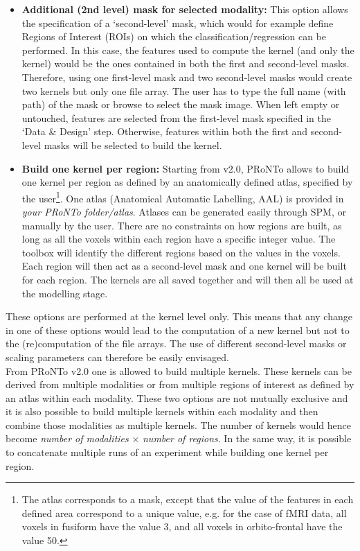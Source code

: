 \begin{itemize}

\item \textbf{Additional (2nd level) mask for selected modality:} This option allows the specification of a `second-level' mask, which would for example define Regions of Interest (ROIs) on which the classification/regression can be performed. In this case, the features used to compute the kernel (and only the kernel) would be the ones contained in both the first and second-level masks. Therefore, using one first-level mask and two second-level masks would create two kernels but only one file array. The user has to type the full name (with path) of the mask or browse to select the mask image. When left empty or untouched, features are selected from the first-level mask specified in the `Data \& Design' step. Otherwise, features within both the first and second-level masks will be selected to build the kernel.

\item \textbf{Build one kernel per region:} Starting from v2.0, PRoNTo allows to build one kernel per region as defined by an anatomically defined atlas, specified by the user\footnote{The atlas corresponds to a mask, except that the value of the features in each defined area correspond to a unique value, e.g. for the case of fMRI data, all voxels in fusiform have the value 3, and all voxels in orbito-frontal have the value 50.}. One atlas (Anatomical Automatic Labelling, AAL) is provided in \textit{your PRoNTo folder/atlas}. Atlases can be generated easily through SPM, or manually by the user. There are no constraints on how regions are built, as long as all the voxels within each region have a specific integer value. The toolbox will identify the different regions based on the values in the voxels. Each region will then act as a second-level mask and one kernel will be built for each region. The kernels are all saved together and will then all be used at the modelling stage.
\end{itemize}

These options are performed at the kernel level only. This means that any change in one of these options would lead to the computation of a new kernel but not to the (re)computation of the file arrays. The use of different second-level masks or scaling parameters can therefore be easily envisaged.
\\

From PRoNTo v2.0 one is allowed to build multiple kernels. These kernels can be derived from multiple modalities or from multiple regions of interest as defined by an atlas within each modality. These two options are not mutually exclusive and it is also possible to build multiple kernels within each modality and then combine those modalities as multiple kernels. The number of kernels would hence become \textit{number of modalities} $\times$ \textit{number of regions}. In the same way, it is possible to concatenate multiple runs of an experiment while building one kernel per region.





